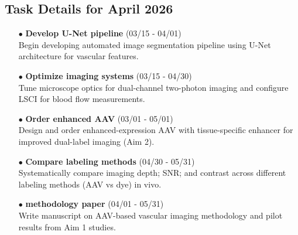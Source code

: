 \documentclass[landscape,a4paper]{article}
\begin{document}
\vspace{0.5cm}
\subsection{Task Details for April 2026}
\begin{itemize}[leftmargin=1cm]
    \item[\textcolor{other}{$\bullet$}] \textbf{Develop U-Net pipeline} (03/15 - 04/01)\\ Begin developing automated image segmentation pipeline using U-Net architecture for vascular features.
    \item[\textcolor{other}{$\bullet$}] \textbf{Optimize imaging systems} (03/15 - 04/30)\\ Tune microscope optics for dual-channel two-photon imaging and configure LSCI for blood flow measurements.
    \item[\textcolor{other}{$\bullet$}] \textbf{Order enhanced AAV} (03/01 - 05/01)\\ Design and order enhanced-expression AAV with tissue-specific enhancer for improved dual-label imaging (Aim 2).
    \item[\textcolor{other}{$\bullet$}] \textbf{Compare labeling methods} (04/30 - 05/31)\\ Systematically compare imaging depth; SNR; and contrast across different labeling methods (AAV vs dye) in vivo.
    \item[\textcolor{researchout}{$\bullet$}] \textbf{methodology paper} (04/01 - 05/31)\\ Write manuscript on AAV-based vascular imaging methodology and pilot results from Aim 1 studies.
\end{itemize}
\end{document}
